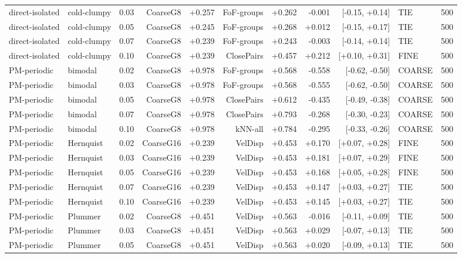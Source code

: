 \begin{tabular}{lllrrrrrrlr}
direct-isolated & cold-clumpy & 0.03 & CoarseG8 & +0.257 & FoF-groups & +0.262 & -0.001 & [-0.15, +0.14] & TIE & 500\\
direct-isolated & cold-clumpy & 0.05 & CoarseG8 & +0.245 & FoF-groups & +0.268 & +0.012 & [-0.15, +0.17] & TIE & 500\\
direct-isolated & cold-clumpy & 0.07 & CoarseG8 & +0.239 & FoF-groups & +0.243 & -0.003 & [-0.14, +0.14] & TIE & 500\\
direct-isolated & cold-clumpy & 0.10 & CoarseG8 & +0.239 & ClosePairs & +0.457 & +0.212 & [+0.10, +0.31] & FINE & 500\\
\midrule
PM-periodic & bimodal & 0.02 & CoarseG8 & +0.978 & FoF-groups & +0.568 & -0.558 & [-0.62, -0.50] & COARSE & 500\\
PM-periodic & bimodal & 0.03 & CoarseG8 & +0.978 & FoF-groups & +0.568 & -0.555 & [-0.62, -0.50] & COARSE & 500\\
PM-periodic & bimodal & 0.05 & CoarseG8 & +0.978 & ClosePairs & +0.612 & -0.435 & [-0.49, -0.38] & COARSE & 500\\
PM-periodic & bimodal & 0.07 & CoarseG8 & +0.978 & ClosePairs & +0.793 & -0.268 & [-0.30, -0.23] & COARSE & 500\\
PM-periodic & bimodal & 0.10 & CoarseG8 & +0.978 & kNN-all & +0.784 & -0.295 & [-0.33, -0.26] & COARSE & 500\\
PM-periodic & Hernquist & 0.02 & CoarseG16 & +0.239 & VelDisp & +0.453 & +0.170 & [+0.07, +0.28] & FINE & 500\\
PM-periodic & Hernquist & 0.03 & CoarseG16 & +0.239 & VelDisp & +0.453 & +0.181 & [+0.07, +0.29] & FINE & 500\\
PM-periodic & Hernquist & 0.05 & CoarseG16 & +0.239 & VelDisp & +0.453 & +0.168 & [+0.05, +0.28] & FINE & 500\\
PM-periodic & Hernquist & 0.07 & CoarseG16 & +0.239 & VelDisp & +0.453 & +0.147 & [+0.03, +0.27] & TIE & 500\\
PM-periodic & Hernquist & 0.10 & CoarseG16 & +0.239 & VelDisp & +0.453 & +0.145 & [+0.03, +0.27] & TIE & 500\\
PM-periodic & Plummer & 0.02 & CoarseG8 & +0.451 & VelDisp & +0.563 & -0.016 & [-0.11, +0.09] & TIE & 500\\
PM-periodic & Plummer & 0.03 & CoarseG8 & +0.451 & VelDisp & +0.563 & +0.029 & [-0.07, +0.13] & TIE & 500\\
PM-periodic & Plummer & 0.05 & CoarseG8 & +0.451 & VelDisp & +0.563 & +0.020 & [-0.09, +0.13] & TIE & 500\\

\end{tabular}
